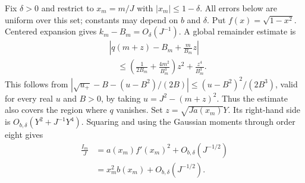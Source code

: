\documentclass[aps,pra,reprint,superscriptaddress]{revtex4-2}
\theoremstyle{remark}
\begin{document}
Fix $\delta>0$ and restrict to $x_m=m/J$ with
$|x_m|\leq1-\delta$. All errors below are uniform over this set;
constants may depend on $b$ and $\delta$. Put
$f(x)=\sqrt{1-x^2}$. Centered expansion gives
$k_m-B_m=O_\delta(J^{-1})$. A global remainder estimate is
\begin{equation}
\begin{aligned}
&\left|q(m+z)-B_m+\frac{m}{B_m}z\right|\\
&\quad\leq\left(\frac1{2B_m}+\frac{4m^2}{B_m^3}\right)z^2
             +\frac{z^4}{B_m^3}.
\end{aligned}
\label{eq:q-taylor}
\end{equation}
This follows from
$|\sqrt{u_+}-B-(u-B^2)/(2B)|\leq(u-B^2)^2/(2B^3)$,
valid for every real $u$ and $B>0$, by taking
$u=J^2-(m+z)^2$. Thus the estimate also covers the region where
$q$ vanishes. Set $z=\sqrt{Ja(x_m)}Y$. Its right-hand side is
$O_{b,\delta}(Y^2+J^{-1}Y^4)$. Squaring and using the Gaussian
moments through order eight gives
\begin{equation}
\begin{aligned}
\frac{I_m}{J}
 &=a(x_m)f'(x_m)^2+O_{b,\delta}(J^{-1/2})\\
 &=x_m^2b(x_m)+O_{b,\delta}(J^{-1/2}).
\end{aligned}
\label{eq:I-limit}
\end{equation}
\end{document}
